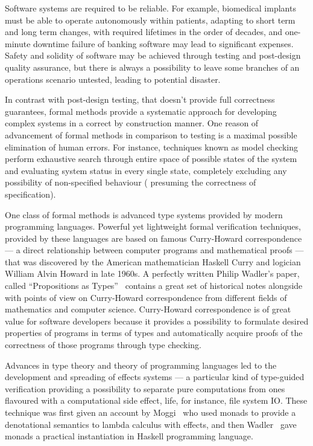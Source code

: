 Software systems are required to be reliable. For example, biomedical implants must be able to operate autonomously within patients, adapting to short term and long term changes, with required lifetimes in the order of decades, and one-minute downtime failure of banking software may lead to significant expenses. Safety and solidity of software may be achieved through testing and post-design quality assurance, but there is always a possibility to leave some branches of an operations scenario untested, leading to potential disaster.

In contrast with post-design testing, that doesn’t provide full
correctness guarantees, formal methods provide a systematic approach for developing complex systems in a correct by construction manner. One reason of advancement of
formal methods in comparison to testing is a maximal possible elimination of human errors. For instance, techniques known as model checking perform exhaustive search
through entire space of possible states of the system and evaluating system status in
every single state, completely excluding any possibility of non-specified behaviour (
presuming the correctness of specification).

One class of formal methods is advanced type systems provided by modern programming languages. Powerful yet lightweight formal verification techniques, provided by these languages are based on famous Curry-Howard correspondence --- a direct relationship between computer programs and mathematical
proofs --- that was discovered by the American mathematician Haskell Curry and logician
William Alvin Howard in late 1960s. A perfectly written Philip Wadler’s paper,
called ``Propositions as Types''~\cite{Wadler:2015:PT:2847579.2699407}
contains a great set of historical notes alongside with points of view on
Curry-Howard correspondence from different fields of
mathematics and computer science. Curry-Howard correspondence is of great value
for software developers because it provides a possibility to formulate desired
properties of programs in terms of types and automatically acquire proofs of
the correctness of those programs through type checking.

Advances in type theory and theory of programming languages led to the development and spreading of effects systems --- a particular kind of type-guided verification providing a possibility to separate pure computations from ones flavoured with a computational side effect, life, for instance, file system IO. These technique
was first given an account by Moggi~\cite{Moggi:1991:NCM:116981.116984} who
used monads to provide a denotational semantics to lambda calculus with effects, and then Wadler~\cite{Wadler:1992:EFP:143165.143169} gave monads a practical instantiation in Haskell programming language.

